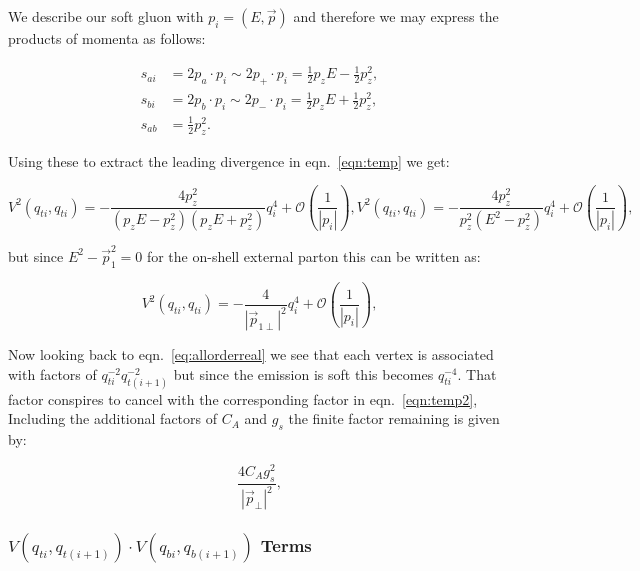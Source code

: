 			We describe our soft gluon with $p_i=(E, \vec{p})$ and therefore we may express the
			products of momenta as follows:

			\begin{align}
				s_{ai} &= 2p_a\cdot p_i\sim2p_+\cdot p_i = \frac12p_zE - \frac12p_z^2,\\
				s_{bi} &= 2p_b\cdot p_i\sim2p_-\cdot p_i = \frac12p_zE + \frac12p_z^2,\\
				s_{ab} &= \frac12p_z^2.
			\end{align}

			Using these to extract the leading divergence in eqn.~\eqref{eqn:temp} we get:

			\begin{subequations}
				\begin{equation}
				V^2(q_{ti}, q_{ti}) = - \frac{4p_z^2}{(p_zE - p_z^2)(p_zE + p_z^2)}q^4_{i} + \mathcal{O}\left(\frac{1}{|p_i|}\right),
				\end{equation}
				\begin{equation}
				V^2(q_{ti}, q_{ti}) = - \frac{4p_z^2}{p_z^2(E^2-p_z^2)}q^4_{i} + \mathcal{O}\left(\frac{1}{|p_i|}\right),
				\end{equation}
			\end{subequations}

			but since $E^2-\vec{p}_1^2=0$ for the on-shell external parton this can be written as:

			\begin{equation}
				V^2(q_{ti}, q_{ti}) = - \frac{4}{|\vec{p}_{1\perp}|^2}q^4_{i} + \mathcal{O}\left(\frac{1}{|p_i|}\right),
				\label{eqn:temp2}
			\end{equation}

			Now looking back to eqn.~\eqref{eq:allorderreal} we see that each vertex is associated with factors of
			$q^{-2}_{ti}q^{-2}_{t(i+1)}$ but since the emission is soft this becomes $q^{-4}_{ti}$.
			That factor conspires to cancel with the corresponding factor in eqn.~\eqref{eqn:temp2},
			Including the additional factors of $C_A$ and $g_s$ the finite factor remaining is given by:

			\begin{equation}
				\frac{4C_Ag_s^2}{|\vec{p}_\perp|^2},
				\label{eqn:finalsoft}
			\end{equation}

		\subsubsection{$V(q_{ti}, q_{t(i+1)})\cdot V(q_{bi}, q_{b(i+1)})$ Terms}
			\label{sub:subsection_name}

